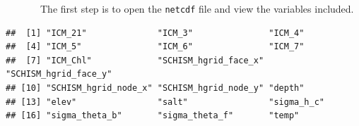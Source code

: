 \documentclass[
]{article}
\newenvironment{Shaded}{\begin{snugshade}}{\end{snugshade}}
\newcommand{\FunctionTok}[1]{\textcolor[rgb]{0.00,0.00,0.00}{#1}}
\newcommand{\NormalTok}[1]{#1}
\newcommand{\OtherTok}[1]{\textcolor[rgb]{0.56,0.35,0.01}{#1}}
\newcommand{\SpecialCharTok}[1]{\textcolor[rgb]{0.00,0.00,0.00}{#1}}
\newcommand{\StringTok}[1]{\textcolor[rgb]{0.31,0.60,0.02}{#1}}
\begin{document}
~~~~~~~The first step is to open the \texttt{netcdf} file and view the
variables included.

\singlespacing

\begin{Shaded}
\end{Shaded}

\begin{verbatim}
##  [1] "ICM_21"              "ICM_3"               "ICM_4"              
##  [4] "ICM_5"               "ICM_6"               "ICM_7"              
##  [7] "ICM_Chl"             "SCHISM_hgrid_face_x" "SCHISM_hgrid_face_y"
## [10] "SCHISM_hgrid_node_x" "SCHISM_hgrid_node_y" "depth"              
## [13] "elev"                "salt"                "sigma_h_c"          
## [16] "sigma_theta_b"       "sigma_theta_f"       "temp"
\end{verbatim}

\onehalfspacing
\end{document}
